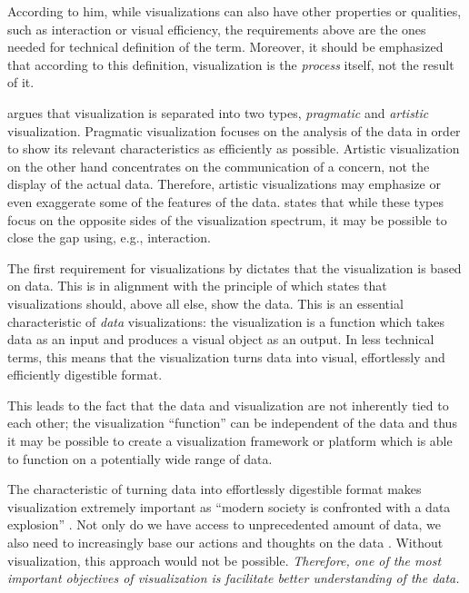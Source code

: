 According to him, while visualizations can also have other properties or qualities, such as interaction or visual efficiency, the requirements above are the ones needed for technical definition of the term. Moreover, it should be emphasized that according to this definition, visualization is the \emph{process} itself, not the result of it.

\citet[chap.~4]{kosara_visualization_2007} argues that visualization is separated into two types, \emph{pragmatic} and \emph{artistic} visualization. Pragmatic visualization focuses on the analysis of the data in order to show its relevant characteristics as efficiently as possible. Artistic visualization on the other hand concentrates on the communication of a concern, not the display of the actual data. Therefore, artistic visualizations may emphasize or even exaggerate some of the features of the data. \citeauthor{kosara_visualization_2007} states that while these types focus on the opposite sides of the visualization spectrum, it may be possible to close the gap using, e.g., interaction.

The first requirement for visualizations by \citet{kosara_visualization_2007} dictates that the visualization is based on data. This is in alignment with the principle of \citet{tufte_visual_1986} which states that visualizations should, above all else, show the data. This is an essential characteristic of \emph{data} visualizations: the visualization is a function which takes data as an input and produces a visual object as an output. In less technical terms, this means that the visualization turns data into visual, effortlessly and efficiently digestible format.

This leads to the fact that the data and visualization are not inherently tied to each other; the visualization ``function'' can be independent of the data and thus it may be possible to create a visualization framework or platform which is able to function on a potentially wide range of data.

The characteristic of turning data into effortlessly digestible format makes visualization extremely important as ``modern society is confronted with a data explosion'' \citep{van_wijk_value_2005}. Not only do we have access to unprecedented amount of data, we also need to increasingly base our actions and thoughts on the data \citep{van_wijk_value_2005}. Without visualization, this approach would not be possible. \emph{Therefore, one of the most important objectives of visualization is facilitate better understanding of the data.}

